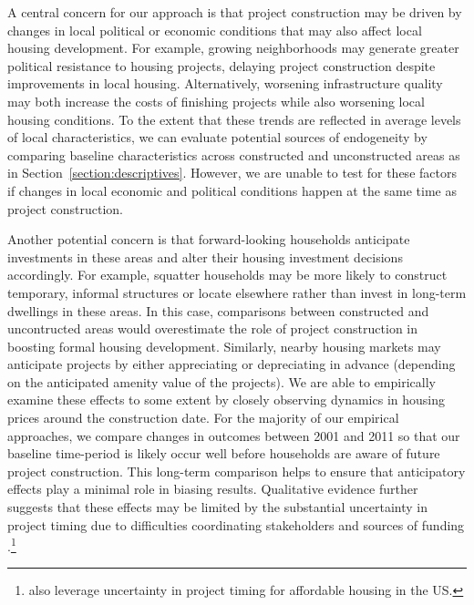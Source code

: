 \documentclass[12pt]{article}
\begin{document}
A central concern for our approach is that project construction may be driven by changes in local political or economic conditions that may also affect local housing development.  For example, growing neighborhoods may generate greater political resistance to housing projects, delaying project construction despite improvements in local housing.  Alternatively, worsening infrastructure quality may both increase the costs of finishing projects while also worsening local housing conditions.  To the extent that these trends are reflected in average levels of local characteristics, we can evaluate potential sources of endogeneity by comparing baseline characteristics across constructed and unconstructed areas as in Section~\ref{section:descriptives}.  However, we are unable to test for these factors if changes in local economic and political conditions happen at the same time as project construction.

Another potential concern is that forward-looking households anticipate investments in these areas and alter their housing investment decisions accordingly.  For example, squatter households may be more likely to construct temporary, informal structures or locate elsewhere rather than invest in long-term dwellings in these areas.  In this case, comparisons between constructed and uncontructed areas would overestimate the role of project construction in boosting formal housing development.  Similarly, nearby housing markets may anticipate projects by either appreciating or depreciating in advance (depending on the anticipated amenity value of the projects).  We are able to empirically examine these effects to some extent by closely observing dynamics in housing prices around the construction date.  For the majority of our empirical approaches, we compare changes in outcomes between 2001 and 2011 so that our baseline time-period is likely occur well before households are aware of future project construction.  This long-term comparison helps to ensure that anticipatory effects play a minimal role in biasing results.  Qualitative evidence further suggests that these effects may be limited by the substantial uncertainty in project timing due to difficulties coordinating stakeholders and sources of funding \citep{serihistory}.\footnote{\cite{diamond2016wants} also leverage uncertainty in project timing for affordable housing in the US.}
\end{document}
